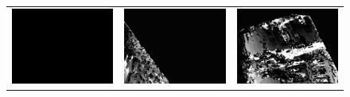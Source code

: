 \documentclass[11pt]{report}
\begin{document}
\begin{figure}[H]
\begin{tabular}{ccc}
    \includegraphics[scale=0.1]{images/disparity-opencv-t/disparity_15.png} &
    \includegraphics[scale=0.1]{images/disparity-opencv-d/disparity_15.png} &
    \includegraphics[scale=0.1]{images/disparity-opengv/disparity_15.png} \\

\end{tabular}
\end{figure}
\end{document}
